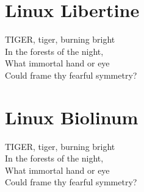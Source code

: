 \documentclass{scrartcl}
\begin{document}
\section{Linux Libertine}

TIGER, tiger, burning bright \\ 
In the forests of the night, \\	 
What immortal hand or eye \\	 
Could frame thy fearful symmetry? \\

\section{Linux Biolinum}

TIGER, tiger, burning bright \\	 
In the forests of the night, \\	 
What immortal hand or eye \\	 
Could frame thy fearful symmetry? \\
\end{document}
